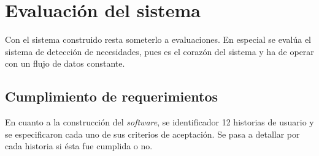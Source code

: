 \chapter{Evaluación del sistema}
\label{cap:experimentos}

Con el sistema construido resta someterlo a evaluaciones. En especial se evalúa el sistema de detección de necesidades, pues es el corazón del sistema y ha de operar con un flujo de datos constante.

\section{Cumplimiento de requerimientos}
\label{seC:cumpRequerimientos}

En cuanto a la construcción del \textit{software}, se identificador 12 historias de usuario y se especificaron cada uno de sus criterios de aceptación. Se pasa a detallar por cada historia si ésta fue cumplida o no.

